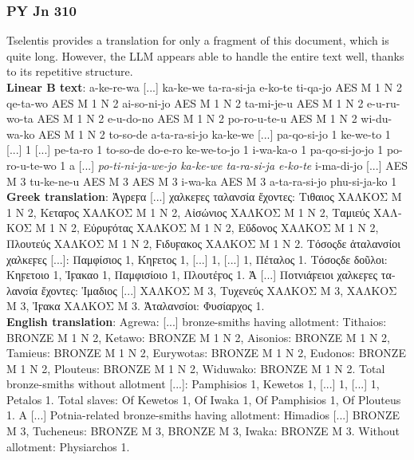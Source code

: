 \subsubsection{PY Jn 310} \label{doc:pyjn310}
Tselentis provides a translation for only a fragment of this document, which is quite long.
However, the LLM appears able to handle the entire text well, thanks to its repetitive structure. \\
\textbf{Linear B text}: a-ke-re-wa [...] ka-ke-we ta-ra-si-ja e-ko-te ti-qa-jo AES M 1 N 2 qe-ta-wo AES M 1 N 2 ai-so-ni-jo AES M 1 N 2 ta-mi-je-u AES M 1 N 2 e-u-ru-wo-ta AES M 1 N 2 e-u-do-no AES M 1 N 2 po-ro-u-te-u AES M 1 N 2 wi-du-wa-ko AES M 1 N 2 to-so-de a-ta-ra-si-jo ka-ke-we [...] pa-qo-si-jo 1 ke-we-to 1 [...] 1 [...] pe-ta-ro 1 to-so-de do-e-ro ke-we-to-jo 1 i-wa-ka-o 1 pa-qo-si-jo-jo 1 po-ro-u-te-wo 1 a [...] \textit{po-ti-ni-ja-we-jo ka-ke-we ta-ra-si-ja e-ko-te} i-ma-di-jo [...] AES M 3 tu-ke-ne-u AES M 3 AES M 3 i-wa-ka AES M 3 a-ta-ra-si-jo phu-si-ja-ko 1 \\
\textbf{Greek translation}: \textgreek{Ἀγρεϝα [...] χαλκεϝες ταλανσία ἔχοντες: Τιθαιος ΧΑΛΚΟΣ M 1 N 2, Κεταϝος ΧΑΛΚΟΣ M 1 N 2, Αἰσώνιος ΧΑΛΚΟΣ M 1 N 2, Ταμιεύς ΧΑΛΚΟΣ M 1 N 2, Εὐρυϝότας ΧΑΛΚΟΣ M 1 N 2, Εὔδονος ΧΑΛΚΟΣ M 1 N 2, Πλουτεύς ΧΑΛΚΟΣ M 1 N 2, Ϝιδυϝακος ΧΑΛΚΟΣ M 1 N 2. Τόσοςδε ἀταλανσίοι χαλκεϝες [...]: Παμφίσιος 1, Κηϝετος 1, [...] 1, [...] 1, Πέταλος 1. Τόσοςδε δοῦλοι: Κηϝετοιο 1, Ἰϝακαο 1, Παμφισίοιο 1, Πλουτέϝος 1. Ἀ [...] Ποτνιάϝειοι χαλκεϝες ταλανσία ἔχοντες: Ἱμαδιος [...] ΧΑΛΚΟΣ M 3, Τυχενεύς ΧΑΛΚΟΣ M 3, ΧΑΛΚΟΣ M 3, Ἰϝακα ΧΑΛΚΟΣ M 3. Ἀταλανσίοι: Φυσίαρχος 1.} \\
\textbf{English translation}: Agrewa: [...] bronze-smiths having allotment: Tithaios: BRONZE M 1 N 2, Ketawo: BRONZE M 1 N 2, Aisonios: BRONZE M 1 N 2, Tamieus: BRONZE M 1 N 2, Eurywotas: BRONZE M 1 N 2, Eudonos: BRONZE M 1 N 2, Plouteus: BRONZE M 1 N 2, Widuwako: BRONZE M 1 N 2. Total bronze-smiths without allotment [...]: Pamphisios 1, Kewetos 1, [...] 1, [...] 1, Petalos 1. Total slaves: Of Kewetos 1, Of Iwaka 1, Of Pamphisios 1, Of Plouteus 1. A [...] Potnia-related bronze-smiths having allotment: Himadios [...] BRONZE M 3, Tucheneus: BRONZE M 3, BRONZE M 3, Iwaka: BRONZE M 3. Without allotment: Physiarchos 1.

